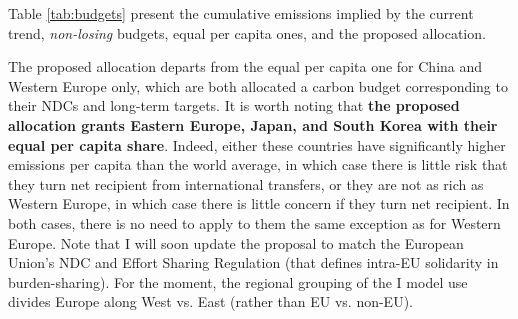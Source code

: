\documentclass[12pt,english]{article}
\begin{document}
Table \ref{tab:budgets} present the cumulative emissions implied by the current trend, \textit{non-losing} budgets, equal per capita ones, and the proposed allocation. 

The proposed allocation departs from the equal per capita one for China and Western Europe only, which are both allocated a carbon budget corresponding to their NDCs and long-term targets. It is worth noting that \textbf{the proposed allocation grants Eastern Europe, Japan, and South Korea with their equal per capita share}. 
Indeed, either these countries have significantly higher emissions per capita than the world average, in which case there is little risk that they turn net recipient from international transfers, or they are not as rich as Western Europe, in which case there is little concern if they turn net recipient. In both cases, there is no need to apply to them the same exception as for Western Europe. Note that I will soon update the proposal to match the European Union's NDC and Effort Sharing Regulation (that defines intra-EU solidarity in burden-sharing). For the moment, the regional grouping of the I model use divides Europe along West vs. East (rather than EU vs. non-EU). %
\end{document}
